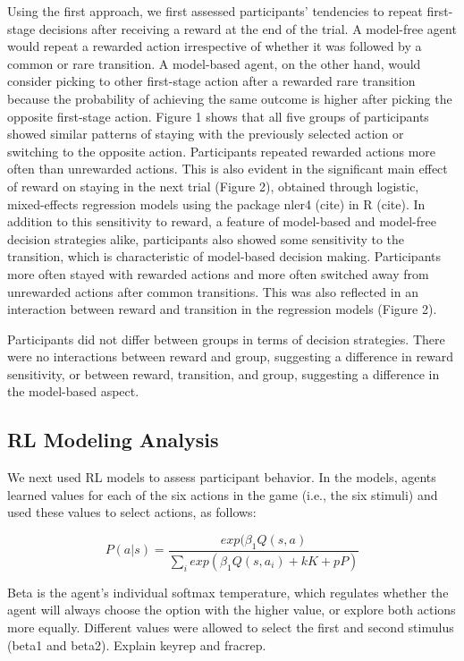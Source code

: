 \documentclass[11pt]{article} %
\begin{document}
Using the first approach, we first assessed participants' tendencies to repeat first-stage decisions after receiving a reward at the end of the trial. A model-free agent would repeat a rewarded action irrespective of whether it was followed by a common or rare transition. A model-based agent, on the other hand, would consider picking to other first-stage action after a rewarded rare transition because the probability of achieving the same outcome is higher after picking the opposite first-stage action. Figure 1 shows that all five groups of participants showed similar patterns of staying with the previously selected action or switching to the opposite action. Participants repeated rewarded actions more often than unrewarded actions. This is also evident in the significant main effect of reward on staying in the next trial (Figure 2), obtained through logistic, mixed-effects regression models using the package nler4 (cite) in R (cite). In addition to this sensitivity to reward, a feature of model-based and model-free decision strategies alike, participants also showed some sensitivity to the transition, which is characteristic of model-based decision making. Participants more often stayed with rewarded actions and more often switched away from unrewarded actions after common transitions. This was also reflected in an interaction between reward and transition in the regression models (Figure 2).

Participants did not differ between groups in terms of decision strategies. There were no interactions between reward and group, suggesting a difference in reward sensitivity, or between reward, transition, and group, suggesting a difference in the model-based aspect. 

\subsection{RL Modeling Analysis}
We next used RL models to assess participant behavior. In the models, agents learned values for each of the six actions in the game (i.e., the six stimuli) and used these values to select actions, as follows:

\begin{equation}
P(a|s) = \frac{exp(\beta_{1} Q(s,a)}{\sum_{i} exp(\beta_{1} Q(s,a_{i}) + k K + p P)}
\end{equation}

Beta is the agent's individual softmax temperature, which regulates whether the agent will always choose the option with the higher value, or explore both actions more equally. Different values were allowed to select the first and second stimulus (beta1 and beta2). Explain keyrep and fracrep.
\end{document}
